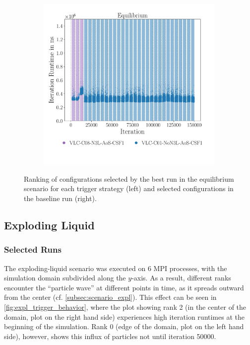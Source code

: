 \begin{figure}[htpb]
\begin{subfigure}{0.5\textwidth}
	\end{subfigure}%
	\begin{subfigure}{0.5\textwidth}
		\centering
		\includegraphics[width=\textwidth]{./Figures/plots/equilibrium_configs_static.pdf}
		\vspace*{-1.1cm}
	\end{subfigure}
	\caption{Ranking of configurations selected by the best run in the equilibrium scenario for each trigger strategy (left) and selected configurations in the baseline run (right).}
	\label{fig:equilibrium_optimality}
\end{figure}


\subsection{Exploding Liquid}
\subsubsection{Selected Runs}
The exploding-liquid scenario was executed on 6 MPI processes, with the simulation domain subdivided along the $y$-axis. As a result, different ranks encounter the \enquote{particle wave} at different points in time, as it spreads outward from the center (cf. \autoref{subsec:scenario_expl}). This effect can be seen in \autoref{fig:expl_trigger_behavior}, where the plot showing rank 2 (in the center of the domain, plot on the right hand side) experiences high iteration runtimes at the beginning of the simulation. Rank 0 (edge of the domain, plot on the left hand side), however, shows this influx of particles not until iteration \num{50000}.


